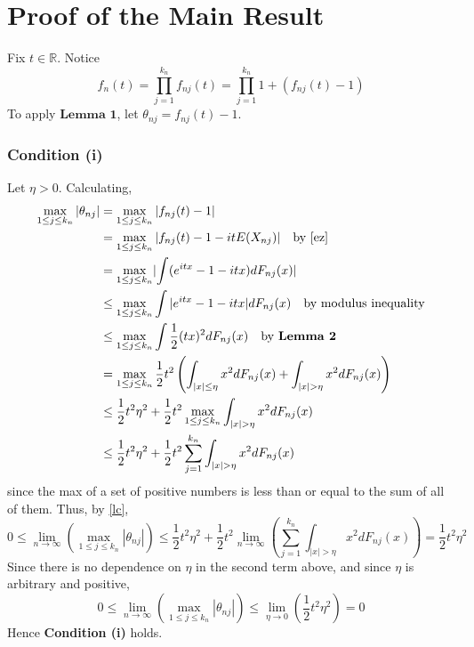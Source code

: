 \documentclass[letterpaper, 12pt]{article}
\newcommand{\R}{\mathbb{R}}
\begin{document}
\section*{Proof of the Main Result}

Fix $t \in \R$. Notice
\[
f_n(t) = \prod_{j=1}^{k_n} f_{nj}(t) = \prod_{j=1}^{k_n} 1 + (f_{nj}(t) - 1)
\]
To apply $\textbf{Lemma 1}$, let $\theta_{nj} = f_{nj}(t) - 1$.

\subsubsection*{Condition (i)}
Let $\eta >0$. Calculating,
\begin{align*}
\max_{1 \leq j \leq k_n} |\theta_{nj}|
&=
\max_{1 \leq j \leq k_n} |f_{nj}(t) - 1|
\\
&=
\max_{1 \leq j \leq k_n} |f_{nj}(t) - 1 - it E(X_{nj})|
\quad
\text{by \eqref{ez}}
\\
&=
\max_{1 \leq j \leq k_n} 
\lvert
\int (e^{itx} - 1 - itx) dF_{nj}(x)
\rvert
\\
&\leq
\max_{1 \leq j \leq k_n}
\int |e^{itx} - 1 -itx| 
dF_{nj}(x)
\quad
\text{by modulus inequality}
\\
&\leq
\max_{1 \leq j \leq k_n}
\int
\frac{1}{2}
(tx)^2
dF_{nj}(x)
\quad
\text{by \textbf{Lemma 2}}
\\
&=
\max_{1 \leq j \leq k_n}
\frac{1}{2} t^2 
\left(
\int_{|x| \leq \eta}
x^2
dF_{nj}(x)
+
\int_{|x| > \eta}
x^2
dF_{nj}(x)
\right)
\\
&\leq
\frac{1}{2} t^2 \eta^2
+
\frac{1}{2}t^2
\max_{1 \leq j \leq k_n}
\int_{|x| > \eta}
x^2
dF_{nj}(x)
\\
&\leq
\frac{1}{2} t^2 \eta^2
+
\frac{1}{2} t^2 
\sum_{j=1}^{k_n}
\int_{|x| > \eta}
x^2
dF_{nj}(x)
\end{align*}
since the max of a set of positive numbers is less than or equal to the sum of all of them.
Thus, by \eqref{lc},
\[
0 
\leq
\lim_{n \to \infty} 
\left(
\max_{1 \leq j \leq k_n} |\theta_{nj}|
\right)
\leq 
\frac{1}{2} t^2 \eta^2
+
\frac{1}{2}t^2
\lim_{n \to \infty}
\left(
\sum_{j=1}^{k_n}
\int_{|x| > \eta}
x^2
dF_{nj}(x)
\right)
=
\frac{1}{2} t^2 \eta^2
\]
Since there is no dependence on $\eta$ in the second term above, and since $\eta$ is arbitrary and positive,
\[
0
\leq
\lim_{n \to \infty} 
\left(
\max_{1 \leq j \leq k_n} |\theta_{nj}|
\right)
\leq
\lim_{\eta \to 0}
\left(
\frac{1}{2} t^2 \eta^2
\right)
=
0
\]
Hence \textbf{Condition (i)} holds.
\end{document}
